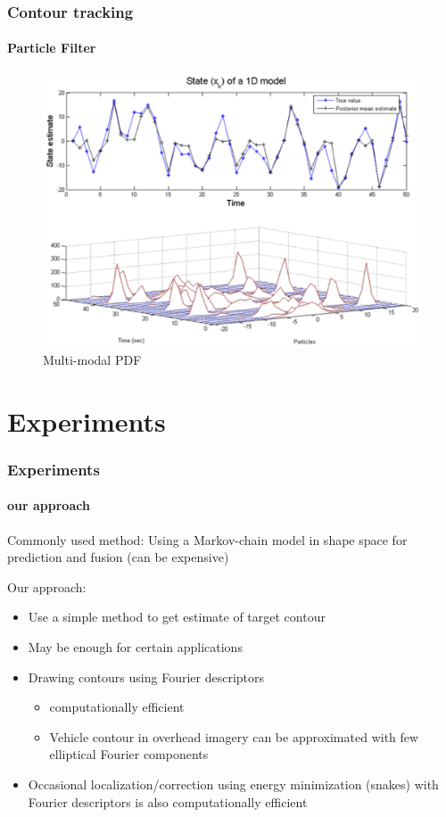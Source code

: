 \begin{frame}
\frametitle{Contour tracking}
\framesubtitle{Particle Filter}
\logoCSIPCPL\mypagenum
	\begin{figure}
		\includegraphics[width=1.0\textwidth]{figs/TRK_ParticleFilter_multimodalPDF.pdf}
		\caption{Multi-modal PDF}
	\end{figure}	
\end{frame}



\section{Experiments}
\begin{frame}
\frametitle{Experiments}
\framesubtitle{our approach}
\logoCSIPCPL\mypagenum
	{\color{red}Commonly used method}: Using a Markov-chain model in shape space for prediction and fusion (can be expensive)
	
	{\color{red}Our approach}:
	\begin{itemize}
		\item Use a simple method to get estimate of target contour
		\item May be enough for certain applications
		\item Drawing contours using Fourier descriptors
			\begin{itemize}
				\item computationally efficient
				\item Vehicle contour in overhead imagery can be approximated with few elliptical Fourier components
			\end{itemize}
		\item Occasional localization/correction using energy minimization (snakes) with Fourier descriptors is also computationally efficient
	\end{itemize}
\end{frame}




